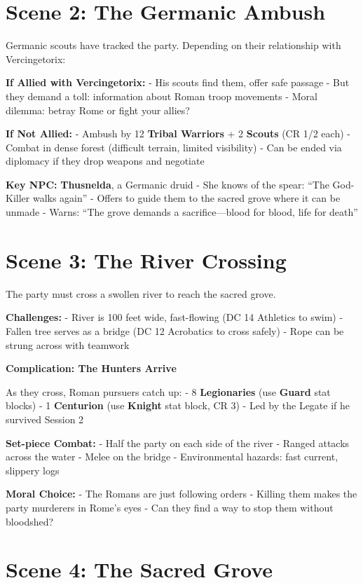 \documentclass[
]{book}
\begin{document}
\section{Scene 2: The Germanic
Ambush}\label{scene-2-the-germanic-ambush}

Germanic scouts have tracked the party. Depending on their relationship
with Vercingetorix:

\textbf{If Allied with Vercingetorix:} - His scouts find them, offer
safe passage - But they demand a toll: information about Roman troop
movements - Moral dilemma: betray Rome or fight your allies?

\textbf{If Not Allied:} - Ambush by 12 \textbf{Tribal Warriors} + 2
\textbf{Scouts} (CR 1/2 each) - Combat in dense forest (difficult
terrain, limited visibility) - Can be ended via diplomacy if they drop
weapons and negotiate

\textbf{Key NPC:} \textbf{Thusnelda}, a Germanic druid - She knows of
the spear: ``The God-Killer walks again'' - Offers to guide them to the
sacred grove where it can be unmade - Warns: ``The grove demands a
sacrifice---blood for blood, life for death''

\section{Scene 3: The River Crossing}\label{scene-3-the-river-crossing}

The party must cross a swollen river to reach the sacred grove.

\textbf{Challenges:} - River is 100 feet wide, fast-flowing (DC 14
Athletics to swim) - Fallen tree serves as a bridge (DC 12 Acrobatics to
cross safely) - Rope can be strung across with teamwork

\textbf{Complication: The Hunters Arrive}

As they cross, Roman pursuers catch up: - 8 \textbf{Legionaries} (use
\textbf{Guard} stat blocks) - 1 \textbf{Centurion} (use \textbf{Knight}
stat block, CR 3) - Led by the Legate if he survived Session 2

\textbf{Set-piece Combat:} - Half the party on each side of the river -
Ranged attacks across the water - Melee on the bridge - Environmental
hazards: fast current, slippery logs

\textbf{Moral Choice:} - The Romans are just following orders - Killing
them makes the party murderers in Rome's eyes - Can they find a way to
stop them without bloodshed?

\section{Scene 4: The Sacred Grove}\label{scene-4-the-sacred-grove}
\end{document}
